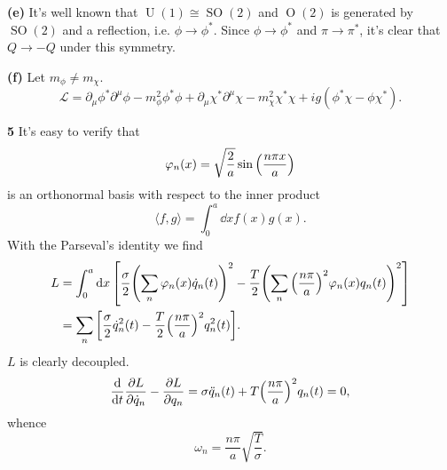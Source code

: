 \documentclass{article}
\makeatletter
\newcommand*{\shifttext}[1]{%
  \settowidth{\@tempdima}{#1}%
  \hspace{-\@tempdima}#1%
}
\newcommand{\plabel}[1]{%
\shifttext{\textbf{#1}\quad}%
}
\newcommand{\prule}{%
\begin{center}%
\hdashrule[0.5ex]{.99\linewidth}{1pt}{1pt 2.5pt}%
\end{center}%
}
\makeatother
\begin{document}
\plabel{(e)}%
It's well known that $\operatorname{U}(1) \cong \operatorname{SO}(2)$ and $\operatorname{O}(2)$ is generated by $\operatorname{SO}(2)$ and a reflection, i.e. $\phi \rightarrow \phi^*$. Since $\phi \rightarrow \phi^*$ and $\pi \rightarrow \pi^*$, it's clear that $Q\rightarrow -Q$ under this symmetry.

\plabel{(f)}%
Let $m_\phi \neq m_\chi$.
\[ \mathcal{L} = \partial_\mu \phi^* \partial^\mu \phi - m_\phi^2 \phi^* \phi + \partial_\mu \chi^* \partial^\mu \chi - m_\chi^2 \chi^* \chi + ig(\phi^*\chi - \phi\chi^*). \]

\prule

\plabel{5}%
It's easy to verify that
\[ \varphi_n(x) = \sqrt{\frac{2}{a}} \sin\qty(\frac{n\pi x}{a}) \]
is an orthonormal basis with respect to the inner product
\[ \langle f,g \rangle = \int_0^a \dd{x} f(x)g(x). \]
With the Parseval's identity we find
\begin{align*}
    L &= \int_0^a \dd{x} \qty[\frac{\sigma}{2} \qty(\sum_n \varphi_n(x) \dot{q}_n(t))^2 - \frac{T}{2} \qty(\sum_n \qty(\frac{n\pi}{a})^2 \varphi_n(x) q_n(t))^2] \\
    &= \sum_n \qty[\frac{\sigma}{2} \dot{q}_n^2(t) - \frac{T}{2}\qty(\frac{n\pi}{a})^2 q^2_n(t)].
\end{align*}
$L$ is clearly decoupled.
\[ \dv{}{t}\pdv{L}{\dot{q}_n} - \pdv{L}{q_n} = \sigma \ddot{q}_n(t) + T \qty(\frac{n\pi}{a})^2 q_n(t) = 0, \]
whence
\[ \omega_n = \frac{n\pi}{a}\sqrt{\frac{T}{\sigma}}. \]
\end{document}
